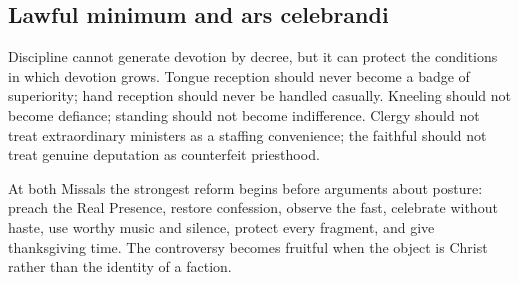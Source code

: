 \subsection{Lawful minimum and ars celebrandi}

Discipline cannot generate devotion by decree, but it can protect the conditions in which devotion grows. Tongue reception should never become a badge of superiority; hand reception should never be handled casually. Kneeling should not become defiance; standing should not become indifference. Clergy should not treat extraordinary ministers as a staffing convenience; the faithful should not treat genuine deputation as counterfeit priesthood.

At both Missals the strongest reform begins before arguments about posture: preach the Real Presence, restore confession, observe the fast, celebrate without haste, use worthy music and silence, protect every fragment, and give thanksgiving time. The controversy becomes fruitful when the object is Christ rather than the identity of a faction.

